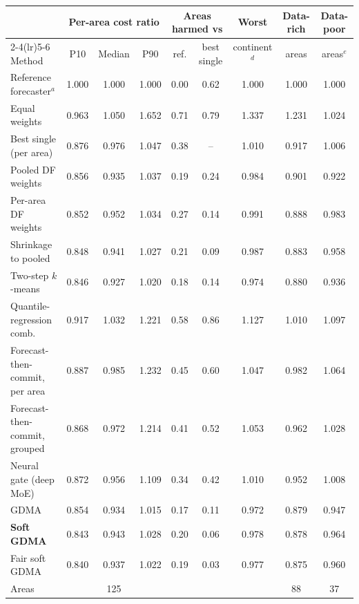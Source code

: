 \begin{tabular}{@{}lcccccccc@{}}
\toprule
 & \multicolumn{3}{c}{Per-area cost ratio} & \multicolumn{2}{c}{Areas harmed vs} & Worst & Data-rich & Data-poor \\
\cmidrule(lr){2-4}\cmidrule(lr){5-6}
Method & P10 & Median & P90 & ref. & best single & continent$^d$ & areas & areas$^e$ \\
\midrule
Reference forecaster$^a$ & 1.000 & 1.000 & 1.000 & 0.00 & 0.62 & 1.000 & 1.000 & 1.000 \\
Equal weights & 0.963 & 1.050 & 1.652 & 0.71 & 0.79 & 1.337 & 1.231 & 1.024 \\
Best single (per area) & 0.876 & 0.976 & 1.047 & 0.38 & -- & 1.010 & 0.917 & 1.006 \\
Pooled DF weights & 0.856 & 0.935 & 1.037 & 0.19 & 0.24 & 0.984 & 0.901 & 0.922 \\
Per-area DF weights & 0.852 & 0.952 & 1.034 & 0.27 & 0.14 & 0.991 & 0.888 & 0.983 \\
Shrinkage to pooled & 0.848 & 0.941 & 1.027 & 0.21 & 0.09 & 0.987 & 0.883 & 0.958 \\
Two-step $k$-means & 0.846 & 0.927 & 1.020 & 0.18 & 0.14 & 0.974 & 0.880 & 0.936 \\
Quantile-regression comb. & 0.917 & 1.032 & 1.221 & 0.58 & 0.86 & 1.127 & 1.010 & 1.097 \\
Forecast-then-commit, per area & 0.887 & 0.985 & 1.232 & 0.45 & 0.60 & 1.047 & 0.982 & 1.064 \\
Forecast-then-commit, grouped & 0.868 & 0.972 & 1.214 & 0.41 & 0.52 & 1.053 & 0.962 & 1.028 \\
Neural gate (deep MoE) & 0.872 & 0.956 & 1.109 & 0.34 & 0.42 & 1.010 & 0.952 & 1.008 \\
GDMA & 0.854 & 0.934 & 1.015 & 0.17 & 0.11 & 0.972 & 0.879 & 0.947 \\
\textbf{Soft GDMA} & 0.843 & 0.943 & 1.028 & 0.20 & 0.06 & 0.978 & 0.878 & 0.964 \\
Fair soft GDMA & 0.840 & 0.937 & 1.022 & 0.19 & 0.03 & 0.977 & 0.875 & 0.960 \\
\midrule
Areas & & 125 & & & & & 88 & 37 \\
\bottomrule
\end{tabular}